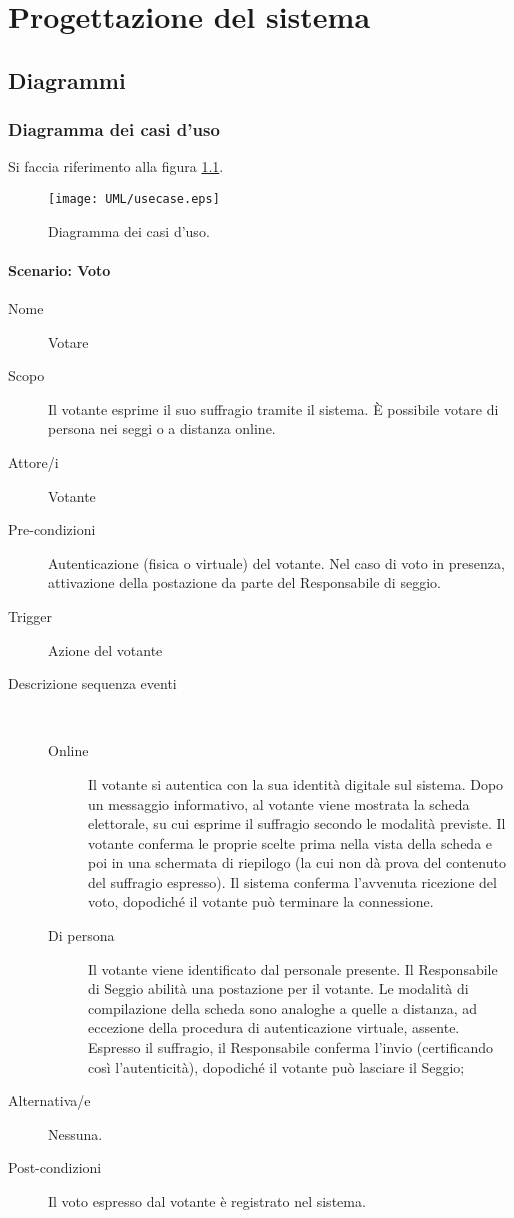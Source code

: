 \chapter{Progettazione del sistema}




\section{Diagrammi}


\subsection{Diagramma dei casi d'uso}
Si faccia riferimento alla figura \ref{fig:usecasediag}.
\begin{figure}[ht]
	\centering
	\texttt{[image: UML/usecase.eps]}
	\caption{Diagramma dei casi d'uso.}
	\label{fig:usecasediag}
\end{figure}


\subsubsection{Scenario: Voto}
\begin{description}
	\item[Nome] Votare
	\item[Scopo] Il votante esprime il suo suffragio tramite il sistema. È possibile votare di persona nei seggi o a distanza online.
	\item[Attore/i] Votante
	\item[Pre-condizioni] Autenticazione (fisica o virtuale) del votante. Nel caso di voto in presenza, attivazione della postazione da parte del Responsabile di seggio.
	\item[Trigger] Azione del votante
	\item[Descrizione sequenza eventi] ~
		\begin{description}
			\item[Online] Il votante si autentica con la sua identità digitale sul sistema. Dopo un messaggio informativo, al votante viene mostrata la scheda elettorale, su cui esprime il suffragio secondo le modalità previste. Il votante conferma le proprie scelte prima nella vista della scheda e poi in una schermata di riepilogo (la cui non dà prova del contenuto del suffragio espresso). Il sistema conferma l'avvenuta ricezione del voto, dopodiché il votante può terminare la connessione.
			\item[Di persona] Il votante viene identificato dal personale presente. Il Responsabile di Seggio abilità una postazione per il votante. Le modalità di compilazione della scheda sono analoghe a quelle a distanza, ad eccezione della procedura di autenticazione virtuale, assente. Espresso il suffragio, il Responsabile conferma l'invio (certificando così l'autenticità), dopodiché il votante può lasciare il Seggio;
		\end{description}
	\item[Alternativa/e] Nessuna.
	\item[Post-condizioni] Il voto espresso dal votante è registrato nel sistema.
\end{description}

